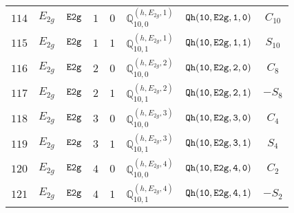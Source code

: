 \documentclass[fleqn,8pt]{jsarticle}
\begin{document}
\begin{table}[ht!]
\begin{center}
\begin{tabular}{cccccccc}
$ 114 $ & $ E_{2g} $ & $ {\tt E2g} $ & $ 1 $ & $ 0 $ & $ \mathbb{Q}_{10,0}^{(h,E_{2g},1)} $ & $ {\tt Qh(10,E2g,1,0)} $ & $ C_{10} $ \\
$ 115 $ & $ E_{2g} $ & $ {\tt E2g} $ & $ 1 $ & $ 1 $ & $ \mathbb{Q}_{10,1}^{(h,E_{2g},1)} $ & $ {\tt Qh(10,E2g,1,1)} $ & $ S_{10} $ \\
$ 116 $ & $ E_{2g} $ & $ {\tt E2g} $ & $ 2 $ & $ 0 $ & $ \mathbb{Q}_{10,0}^{(h,E_{2g},2)} $ & $ {\tt Qh(10,E2g,2,0)} $ & $ C_{8} $ \\
$ 117 $ & $ E_{2g} $ & $ {\tt E2g} $ & $ 2 $ & $ 1 $ & $ \mathbb{Q}_{10,1}^{(h,E_{2g},2)} $ & $ {\tt Qh(10,E2g,2,1)} $ & $ - S_{8} $ \\
$ 118 $ & $ E_{2g} $ & $ {\tt E2g} $ & $ 3 $ & $ 0 $ & $ \mathbb{Q}_{10,0}^{(h,E_{2g},3)} $ & $ {\tt Qh(10,E2g,3,0)} $ & $ C_{4} $ \\
$ 119 $ & $ E_{2g} $ & $ {\tt E2g} $ & $ 3 $ & $ 1 $ & $ \mathbb{Q}_{10,1}^{(h,E_{2g},3)} $ & $ {\tt Qh(10,E2g,3,1)} $ & $ S_{4} $ \\
$ 120 $ & $ E_{2g} $ & $ {\tt E2g} $ & $ 4 $ & $ 0 $ & $ \mathbb{Q}_{10,0}^{(h,E_{2g},4)} $ & $ {\tt Qh(10,E2g,4,0)} $ & $ C_{2} $ \\
$ 121 $ & $ E_{2g} $ & $ {\tt E2g} $ & $ 4 $ & $ 1 $ & $ \mathbb{Q}_{10,1}^{(h,E_{2g},4)} $ & $ {\tt Qh(10,E2g,4,1)} $ & $ - S_{2} $ \\
 \hline \hline
\end{tabular}
\end{center}
\end{table}
\end{document}
